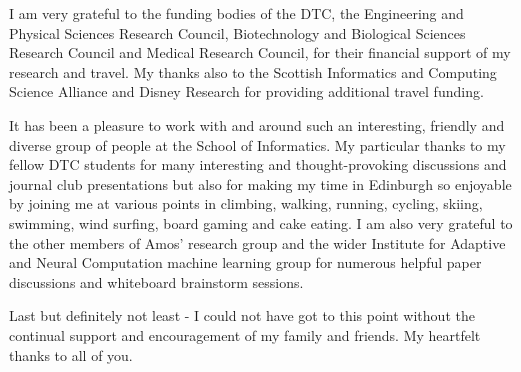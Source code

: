 I am very grateful to the funding bodies of the DTC, the Engineering and Physical Sciences Research Council, Biotechnology and Biological Sciences Research Council and Medical Research Council, for their financial support of my research and travel. My thanks also to the Scottish Informatics and Computing Science Alliance and Disney Research for providing additional travel funding.

It has been a pleasure to work with and around such an interesting, friendly and diverse group of people at the School of Informatics. My particular thanks to my fellow DTC students for many interesting and thought-provoking discussions and journal club presentations but also for making my time in Edinburgh so enjoyable by joining me at various points in climbing, walking, running, cycling, skiing, swimming, wind surfing, board gaming and cake eating. I am also very grateful to the other members of Amos' research group and the wider Institute for Adaptive and Neural Computation machine learning group for numerous helpful paper discussions and whiteboard brainstorm sessions.

Last but definitely not least - I could not have got to this point without the continual support and encouragement of my family and friends. My heartfelt thanks to all of you.

